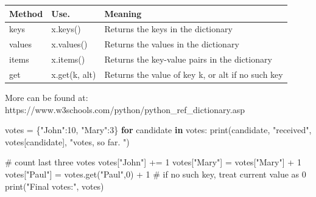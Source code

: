 \documentclass[
  letterpaper,
]{scrbook}
\newenvironment{Shaded}{\begin{snugshade}}{\end{snugshade}}
\newcommand{\BuiltInTok}[1]{\textcolor[rgb]{0.00,0.23,0.31}{#1}}
\newcommand{\CommentTok}[1]{\textcolor[rgb]{0.37,0.37,0.37}{#1}}
\newcommand{\ControlFlowTok}[1]{\textcolor[rgb]{0.00,0.23,0.31}{\textbf{#1}}}
\newcommand{\DecValTok}[1]{\textcolor[rgb]{0.68,0.00,0.00}{#1}}
\newcommand{\KeywordTok}[1]{\textcolor[rgb]{0.00,0.23,0.31}{\textbf{#1}}}
\newcommand{\NormalTok}[1]{\textcolor[rgb]{0.00,0.23,0.31}{#1}}
\newcommand{\OperatorTok}[1]{\textcolor[rgb]{0.37,0.37,0.37}{#1}}
\newcommand{\StringTok}[1]{\textcolor[rgb]{0.13,0.47,0.30}{#1}}
\newcounter{none} %
\begin{document}
{\def\LTcaptype{none} %
\begin{longtable}[]{@{}
  >{\raggedright\arraybackslash}p{}
  >{\raggedright\arraybackslash}p{}
  >{\raggedright\arraybackslash}p{}@{}}
\toprule\noalign{}
\begin{minipage}[b]{\linewidth}\raggedright
Method
\end{minipage} & \begin{minipage}[b]{\linewidth}\raggedright
Use.
\end{minipage} & \begin{minipage}[b]{\linewidth}\raggedright
Meaning
\end{minipage} \\
\midrule\noalign{}
\endhead
\bottomrule\noalign{}
\endlastfoot
keys & x.keys() & Returns the keys in the dictionary \\
values & x.values() & Returns the values in the dictionary \\
items & x.items() & Returns the key-value pairs in the dictionary \\
get & x.get(k, alt) & Returns the value of key k, or alt if no such
key \\
\end{longtable}
}

More can be found at:
https://www.w3schools.com/python/python\_ref\_dictionary.asp

\begin{Shaded}
\begin{Highlighting}[]
\NormalTok{votes }\OperatorTok{=}\NormalTok{ \{}\StringTok{"John"}\NormalTok{:}\DecValTok{10}\NormalTok{, }\StringTok{"Mary"}\NormalTok{:}\DecValTok{3}\NormalTok{\}}
\ControlFlowTok{for}\NormalTok{ candidate }\KeywordTok{in}\NormalTok{ votes:}
    \BuiltInTok{print}\NormalTok{(candidate, }\StringTok{"received"}\NormalTok{, votes[candidate], }\StringTok{"votes, so far. "}\NormalTok{)}

\CommentTok{\# count last three votes}
\NormalTok{votes[}\StringTok{"John"}\NormalTok{] }\OperatorTok{+=} \DecValTok{1}
\NormalTok{votes[}\StringTok{"Mary"}\NormalTok{] }\OperatorTok{=}\NormalTok{ votes[}\StringTok{"Mary"}\NormalTok{] }\OperatorTok{+} \DecValTok{1}
\NormalTok{votes[}\StringTok{"Paul"}\NormalTok{] }\OperatorTok{=}\NormalTok{ votes.get(}\StringTok{"Paul"}\NormalTok{,}\DecValTok{0}\NormalTok{) }\OperatorTok{+} \DecValTok{1}     \CommentTok{\# if no such key, treat current value as 0}
\BuiltInTok{print}\NormalTok{(}\StringTok{"Final votes:"}\NormalTok{, votes)}
\end{Highlighting}
\end{Shaded}
\end{document}
